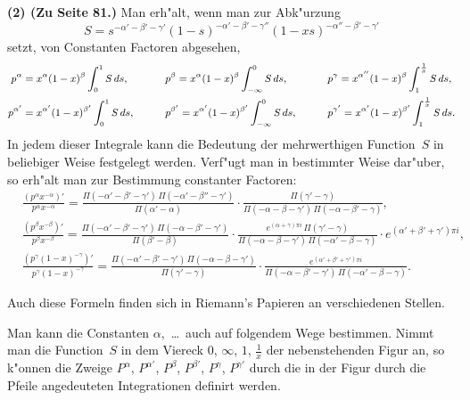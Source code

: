 \documentclass[12pt,a4paper]{book}
\theoremstyle{definition}
\theoremstyle{remark}
\begin{document}
\textbf{(2) (Zu Seite 81.)} Man erh"alt, wenn man zur Abk"urzung
\[
S = s^{-\alpha'-\beta'-\gamma'}(1-s)^{-\alpha'-\beta'-\gamma''}(1-xs)^{-\alpha''-\beta'-\gamma'}
\]
setzt, von Constanten Factoren abgesehen,
\[
\small
\begin{aligned}
p^\alpha &= x^\alpha(1-x)^\beta \int_0^1 S\,ds,\qquad
&&p^\beta = x^\alpha(1-x)^\beta \int_{-\infty}^0 S\,ds,\qquad
&&p^\gamma = x^{\alpha''}(1-x)^\beta \int_1^{\frac{1}{x}} S\,ds,\\
p^{\alpha'} &= x^{\alpha'}(1-x)^{\beta'} \int_0^1 S\,ds,\qquad
&&p^{\beta'} = x^{\alpha'}(1-x)^{\beta'} \int_{-\infty}^0 S\,ds,\qquad
&&p^{\gamma'} = x^{\alpha'}(1-x)^{\beta'} \int_1^{\frac{1}{x}} S\,ds.
\end{aligned}
\]
In jedem dieser Integrale kann die Bedeutung der mehrwerthigen
Function~$S$ in beliebiger Weise festgelegt werden. Verf"ugt man in
bestimmter Weise dar"uber, so erh"alt man zur Bestimmung constanter
Factoren:
\begingroup
\footnotesize
\begin{align*}
&\frac{(p^\alpha x^{-\alpha})'}{p^\alpha x^{-\alpha}} =
\frac{\Pi(-\alpha'-\beta'-\gamma')\,\Pi(-\alpha'-\beta''-\gamma')}
     {\Pi(\alpha' - \alpha)}
\cdot \frac{\Pi(\gamma' - \gamma)}
     {\Pi(-\alpha - \beta - \gamma')\,\Pi(-\alpha - \beta' - \gamma)},\\
&\frac{(p^\beta x^{-\beta})'}{p^\beta x^{-\beta}} =
\frac{\Pi(-\alpha'-\beta'-\gamma')\,\Pi(-\alpha - \beta' - \gamma')}
     {\Pi(\beta' - \beta)}
\cdot \frac{e^{(\alpha+\gamma)\pi i}\,\Pi(\gamma' - \gamma)}
     {\Pi(-\alpha - \beta - \gamma')\,\Pi(-\alpha' - \beta - \gamma)}
\cdot e^{(\alpha'+\beta'+\gamma')\pi i},\\
&\frac{(p^\gamma(1-x)^{-\gamma})'}{p^\gamma(1-x)^{-\gamma}} =
\frac{\Pi(-\alpha'-\beta'-\gamma')\,\Pi(-\alpha - \beta - \gamma')}
     {\Pi(\gamma' - \gamma)}
\cdot \frac{e^{(\alpha'+\beta'+\gamma')\pi i}}
     {\Pi(-\alpha - \beta' - \gamma')\,\Pi(-\alpha' - \beta - \gamma)}.
\end{align*}
\endgroup

Auch diese Formeln finden sich in Riemann's Papieren an verschiedenen
Stellen.

Man kann die Constanten $\alpha$,\ \ldots\ auch auf folgendem Wege bestimmen.
Nimmt man die Function~$S$ in dem Viereck $0$, $\infty$, $1$, $\frac{1}{x}$ der
nebenstehenden Figur an, so k"onnen die Zweige $P^\alpha$, $P^{\alpha'}$,
$P^\beta$, $P^{\beta'}$, $P^\gamma$, $P^{\gamma'}$ durch die in der Figur durch
die Pfeile angedeuteten Integrationen definirt werden.
\end{document}
